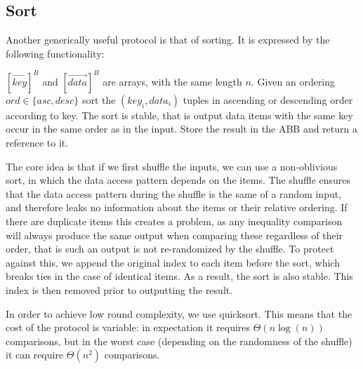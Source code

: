 \subsection{Sort}

Another generically useful protocol is that of sorting. 
It is expressed by the following functionality:

\begin{functionality}
	$[\vec{key}]^B$ and $[\vec{data}]^B$ are arrays,
	with the same length $n$.
	Given an ordering $ord \in \{asc, desc\}$
	sort the $(key_i, data_i)$ tuples in ascending or descending order 
	according to key.
	The sort is stable, that is output data items with the same key
	occur in the same order as in the input.
	Store the result in the ABB and return a reference to it.
\end{functionality}

The core idea is that if we first shuffle the inputs,
we can use a non-oblivious sort, in which the data access pattern 
depends on the items. 
The shuffle ensures that the data access pattern during the shuffle 
is the same of a random input, and therefore leaks no information
about the items or their relative ordering.
If there are duplicate items this creates a problem,
as any inequality comparison will always produce the same output when 
comparing these regardless of their order, 
that is such an output is not re-randomized by the shuffle.
To protect against this, we append the original index to each item before
the sort, which breaks ties in the case of identical items.
As a result, the sort is also stable.
This index is then removed prior to outputting the result.

In order to achieve low round complexity, we use quicksort.
This means that the cost of the protocol is variable:
in expectation it requires $\Theta(n \log(n))$ comparisons,
but in the worst case (depending on the randomness of the shuffle)
it can require $\Theta(n^2)$ comparisons.

